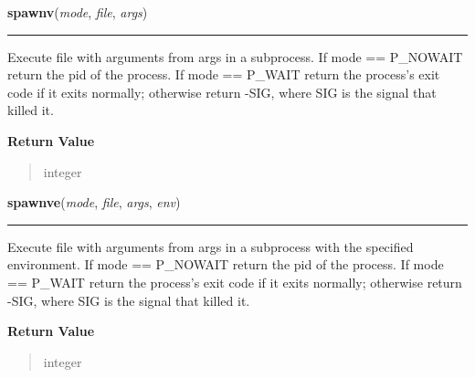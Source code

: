     \label{os:spawnv}

    \vspace{0.5ex}

\hspace{.8\funcindent}\begin{boxedminipage}{\funcwidth}

    \raggedright \textbf{spawnv}(\textit{mode}, \textit{file}, \textit{args})

    \vspace{-1.5ex}

    \rule{\textwidth}{0.5\fboxrule}
\setlength{\parskip}{2ex}
    Execute file with arguments from args in a subprocess. If mode == 
    P\_NOWAIT return the pid of the process. If mode == P\_WAIT return the 
    process's exit code if it exits normally; otherwise return -SIG, where 
    SIG is the signal that killed it.

\setlength{\parskip}{1ex}
      \textbf{Return Value}
    \vspace{-1ex}

      \begin{quote}
      integer

      \end{quote}

    \end{boxedminipage}

    \label{os:spawnve}

    \vspace{0.5ex}

\hspace{.8\funcindent}\begin{boxedminipage}{\funcwidth}

    \raggedright \textbf{spawnve}(\textit{mode}, \textit{file}, \textit{args}, \textit{env})

    \vspace{-1.5ex}

    \rule{\textwidth}{0.5\fboxrule}
\setlength{\parskip}{2ex}
    Execute file with arguments from args in a subprocess with the 
    specified environment. If mode == P\_NOWAIT return the pid of the 
    process. If mode == P\_WAIT return the process's exit code if it exits 
    normally; otherwise return -SIG, where SIG is the signal that killed 
    it.

\setlength{\parskip}{1ex}
      \textbf{Return Value}
    \vspace{-1ex}

      \begin{quote}
      integer

      \end{quote}

    \end{boxedminipage}

